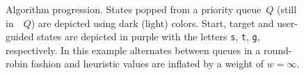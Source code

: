 \documentclass{article}
\begin{document}
\begin{figure}[t]%
  \centering%
	\vspace{-3mm}
  \caption{%
    Algorithm progression.
    States popped from a priority queue~$Q$ (still in~~$Q$) are depicted using dark (light) colors.
    Start, target and user-guided states are depicted in purple with the letters \texttt{s}, \texttt{t}, \texttt{g}, respectively. 
    In this example \mhastar alternates between queues in a round-robin fashion and heuristic values are inflated by a weight of $w=\infty$. 
}
\end{figure}
\end{document}
